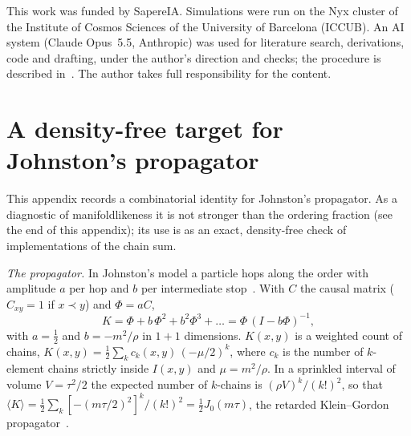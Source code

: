 \documentclass[12pt]{iopart}
\begin{document}
\ack
This work was funded by SapereIA. Simulations were run on the Nyx cluster of the Institute of Cosmos Sciences of the University of Barcelona (ICCUB). An AI system (Claude Opus~5.5, Anthropic) was used for literature search, derivations, code and drafting, under the author's direction and checks; the procedure is described in~\cite{MethodNote}. The author takes full responsibility for the content.

\appendix
\section{A density-free target for Johnston's propagator}\label{app:prop}
This appendix records a combinatorial identity for Johnston's propagator. As a diagnostic of manifoldlikeness it is not stronger than the ordering fraction (see the end of this appendix); its use is as an exact, density-free check of implementations of the chain sum.

\emph{The propagator.} In Johnston's model a particle hops along the order with amplitude $a$ per hop and $b$ per intermediate stop~\cite{Johnston08}. With $C$ the causal matrix ($C_{xy}=1$ if $x\prec y$) and $\Phi=aC$,
\begin{equation}
K=\Phi+b\,\Phi^2+b^2\Phi^3+\dots=\Phi\,(I-b\Phi)^{-1},
\end{equation}
with $a=\tfrac12$ and $b=-m^2/\rho$ in $1+1$ dimensions. $K(x,y)$ is a weighted count of chains, $K(x,y)=\tfrac12\sum_k c_k(x,y)\,(-\mu/2)^k$, where $c_k$ is the number of $k$-element chains strictly inside $I(x,y)$ and $\mu=m^2/\rho$. In a sprinkled interval of volume $V=\tau^2/2$ the expected number of $k$-chains is $(\rho V)^k/(k!)^2$, so that $\langle K\rangle=\tfrac12\sum_k[-(m\tau/2)^2]^k/(k!)^2=\tfrac12J_0(m\tau)$, the retarded Klein--Gordon propagator~\cite{Johnston08}.
\end{document}
